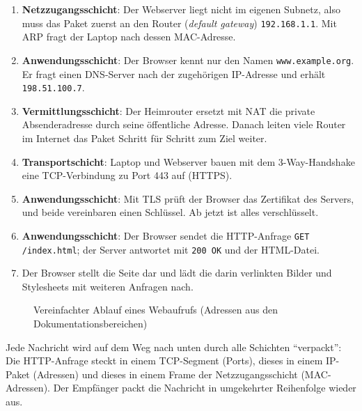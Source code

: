 \begin{enumerate}
    \item \textcolor{\dataLinkLayerColor}{\textbf{Netzzugangsschicht}}: Der Webserver liegt nicht im eigenen Subnetz, also muss das Paket zuerst an den Router (\textit{default gateway}) \texttt{192.168.1.1}. Mit \gls{ARP} fragt der Laptop nach dessen \gls{MAC}-Adresse.
    \item \textcolor{\applicationLayerColor!80!black}{\textbf{Anwendungsschicht}}: Der Browser kennt nur den Namen \texttt{www.example.org}. Er fragt einen \gls{DNS}-Server nach der zugehörigen \gls{IP}-Adresse und erhält \texttt{198.51.100.7}.
    \item \textcolor{\networkLayerColor}{\textbf{Vermittlungsschicht}}: Der Heimrouter ersetzt mit \gls{NAT} die private Absenderadresse durch seine öffentliche Adresse. Danach leiten viele Router im Internet das Paket Schritt für Schritt zum Ziel weiter.
    \item \textcolor{\transportLayerColor}{\textbf{Transportschicht}}: Laptop und Webserver bauen mit dem 3-Way-Handshake eine \gls{TCP}-Verbindung zu Port 443 auf (\gls{HTTPS}).
    \item \textcolor{\applicationLayerColor!80!black}{\textbf{Anwendungsschicht}}: Mit \gls{TLS} prüft der Browser das Zertifikat des Servers, und beide vereinbaren einen Schlüssel. Ab jetzt ist alles verschlüsselt.
    \item \textcolor{\applicationLayerColor!80!black}{\textbf{Anwendungsschicht}}: Der Browser sendet die \gls{HTTP}-Anfrage \texttt{GET /index.html}; der Server antwortet mit \texttt{200 OK} und der \gls{HTML}-Datei.
    \item Der Browser stellt die Seite dar und lädt die darin verlinkten Bilder und Stylesheets mit weiteren Anfragen nach.
\end{enumerate}

\begin{figure}[H]
    \centering
    \resizebox{\textwidth}{!}{}
    \caption{Vereinfachter Ablauf eines Webaufrufs (Adressen aus den Dokumentationsbereichen)}
    \label{fig:webaufruf}
\end{figure}

\begin{myremark}
    Jede Nachricht wird auf dem Weg nach unten durch alle Schichten \enquote{verpackt}: Die \gls{HTTP}-Anfrage steckt in einem \gls{TCP}-Segment (Ports), dieses in einem \gls{IP}-Paket (Adressen) und dieses in einem Frame der Netzzugangsschicht (\gls{MAC}-Adressen). Der Empfänger packt die Nachricht in umgekehrter Reihenfolge wieder aus.
\end{myremark}

